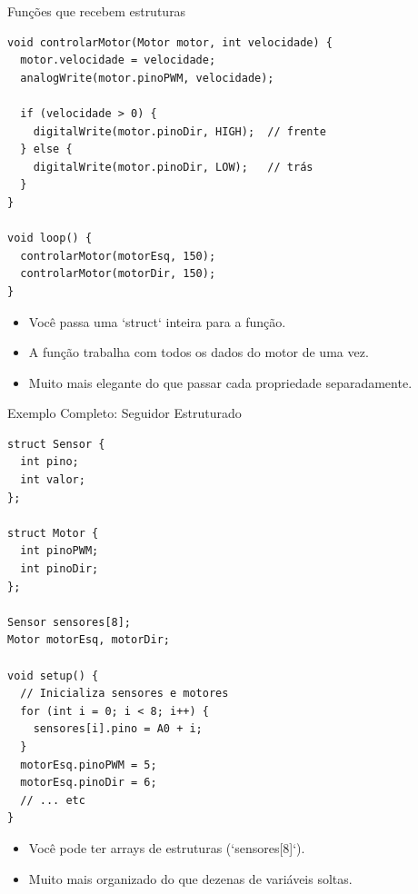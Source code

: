 \documentclass[10pt]{beamer}
\begin{document}
\begin{frame}[fragile]{Funções que recebem estruturas}
\begin{lstlisting}
void controlarMotor(Motor motor, int velocidade) {
  motor.velocidade = velocidade;
  analogWrite(motor.pinoPWM, velocidade);
  
  if (velocidade > 0) {
    digitalWrite(motor.pinoDir, HIGH);  // frente
  } else {
    digitalWrite(motor.pinoDir, LOW);   // trás
  }
}

void loop() {
  controlarMotor(motorEsq, 150);
  controlarMotor(motorDir, 150);
}
\end{lstlisting}

  \begin{itemize}
    \item Você passa uma `struct` inteira para a função.
    \item A função trabalha com todos os dados do motor de uma vez.
    \item Muito mais elegante do que passar cada propriedade separadamente.
  \end{itemize}
\end{frame}

\begin{frame}[fragile]{Exemplo Completo: Seguidor Estruturado}
\begin{lstlisting}
struct Sensor {
  int pino;
  int valor;
};

struct Motor {
  int pinoPWM;
  int pinoDir;
};

Sensor sensores[8];
Motor motorEsq, motorDir;

void setup() {
  // Inicializa sensores e motores
  for (int i = 0; i < 8; i++) {
    sensores[i].pino = A0 + i;
  }
  motorEsq.pinoPWM = 5;
  motorEsq.pinoDir = 6;
  // ... etc
}
\end{lstlisting}

  \begin{itemize}
    \item Você pode ter arrays de estruturas (`sensores[8]`).
    \item Muito mais organizado do que dezenas de variáveis soltas.
  \end{itemize}
\end{frame}
\end{document}
